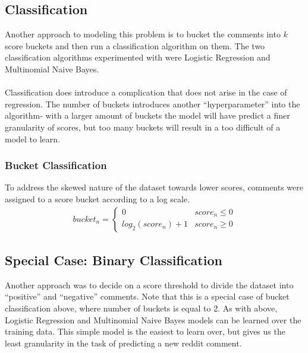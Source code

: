\documentclass[11pt, twocolumn]{article}
\begin{document}
	\subsection{Classification}
	Another approach to modeling this problem is to bucket the comments into $k$ score buckets and then run a classification algorithm on them. The two classification algorithms experimented with were Logistic Regression and Multinomial Naive Bayes. \\
	\\ 
	Classification does introduce a complication that does not arise in the case of regression. The number of buckets introduces another ``hyperparameter'' into the algorithm- with a larger amount of buckets the model will have predict a finer granularity of scores, but too many buckets will result in a too difficult of a model to learn. 
		
		\subsubsection{Bucket Classification}
		To address the skewed nature of the dataset towards lower scores, comments were assigned to a score bucket according to a log scale.
		\begin{gather*}
			bucket_n = \begin{cases}
				0 & score_n \le 0 \\
				log_2(score_n) + 1 & score_n \geq 0
				 \end{cases}
		\end{gather*}
	
	
		\subsection{Special Case: Binary Classification}
		Another approach was to decide on a score threshold to divide the dataset into ``positive'' and ``negative'' comments. Note that this is a special case of bucket classification above, where number of buckets is equal to 2. As with above, Logistic Regression and Multinomial Naive Bayes models can be learned over the training data. This simple model is the easiest to learn over, but gives us the least granularity in the task of predicting a new reddit comment.
\end{document}
